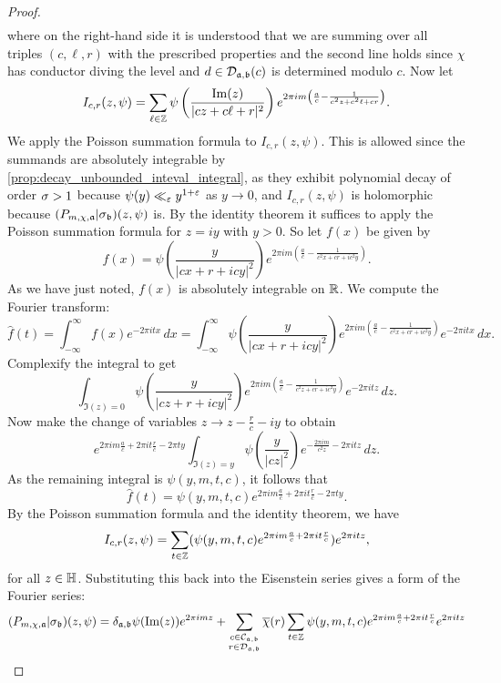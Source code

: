 \documentclass[12pt,oneside]{book}
\begin{document}
\begin{proof}
\begin{align*}
      \end{align*}
     where on the right-hand side it is understood that we are summing over all triples $(c,\ell,r)$ with the prescribed properties and the second line holds since $\chi$ has conductor diving the level and $d \in \mathcal{D}_{\mathfrak{a},\mathfrak{b}}(c)$ is determined modulo $c$. Now let
      \[
        I_{c,r}(z,\psi) = \sum_{\ell \in \mathbb{Z}}\psi\left(\frac{\mathrm{Im}(z)}{|cz+c\ell+r|^{2}}\right)e^{2\pi im\left(\frac{a}{c}-\frac{1}{c^{2}z+c^{2}\ell+cr}\right)}.
      \]
      We apply the Poisson summation formula to $I_{c,r}(z,\psi)$. This is allowed since the summands are absolutely integrable by \cref{prop:decay_unbounded_inteval_integral}, as they exhibit polynomial decay of order $\sigma > 1$ because $\psi(y) \ll_{\varepsilon} y^{1+\varepsilon}$ as $y \to 0$, and $I_{c,r}(z,\psi)$ is holomorphic because $(P_{m,\chi,\mathfrak{a}}|\sigma_{\mathfrak{b}})(z,\psi)$ is. By the identity theorem it suffices to apply the Poisson summation formula for $z = iy$ with $y > 0$. So let $f(x)$ be given by
      \[
        f(x) = \psi\left(\frac{y}{|cx+r+icy|^{2}}\right)e^{2\pi im\left(\frac{a}{c}-\frac{1}{c^{2}x+cr+ic^{2}y}\right)}.
      \]
      As we have just noted, $f(x)$ is absolutely integrable on $\mathbb{R}$. We compute the Fourier transform:
      \[
        \hat{f}(t) = \int_{-\infty}^{\infty}f(x)e^{-2\pi itx}\,dx = \int_{-\infty}^{\infty}\psi\left(\frac{y}{|cx+r+icy|^{2}}\right)e^{2\pi im\left(\frac{a}{c}-\frac{1}{c^{2}x+cr+ic^{2}y}\right)}e^{-2\pi itx}\,dx.
      \]
      Complexify the integral to get
      \[
        \int_{\Im(z) = 0}\psi\left(\frac{y}{|cz+r+icy|^{2}}\right)e^{2\pi im\left(\frac{a}{c}-\frac{1}{c^{2}z+cr+ic^{2}y}\right)}e^{-2\pi itz}\,dz.
      \]
      Now make the change of variables $z \to z-\frac{r}{c}-iy$ to obtain
      \[
        e^{2\pi im\frac{a}{c}+2\pi it\frac{r}{c}-2\pi ty}\int_{\Im(z) = y}\psi\left(\frac{y}{|cz|^{2}}\right)e^{-\frac{2\pi im}{c^{2}z}-2\pi itz}\,dz.
      \]
      As the remaining integral is $\psi(y,m,t,c)$, it follows that
      \[
        \hat{f}(t) = \psi(y,m,t,c)e^{2\pi im\frac{a}{c}+2\pi it\frac{r}{c}-2\pi ty}.
      \]
      By the Poisson summation formula and the identity theorem, we have
      \[
        I_{c,r}(z,\psi) = \sum_{t \in \mathbb{Z}}(\psi(y,m,t,c)e^{2\pi im\frac{a}{c}+2\pi it\frac{r}{c}})e^{2\pi itz},
      \]
      for all $z \in \mathbb{H}$. Substituting this back into the Eisenstein series gives a form of the Fourier series:
      \begin{align*}
        (P_{m,\chi,\mf{a}}|\s_{\mf{b}})(z,\psi) &= \d_{\mf{a},\mf{{b}}}\psi(\Im(z))e^{2\pi imz}+\sum_{\substack{c \in \mc{C}_{\mf{a},\mf{b}} \\ r \in \mc{D}_{\mf{a},\mf{b}}}}\cchi(r)\sum_{t \in \Z}\psi(y,m,t,c)e^{2\pi im\frac{a}{c}+2\pi it\frac{r}{c}}e^{2\pi itz} \\

\end{align*}
\end{proof}
\end{document}
